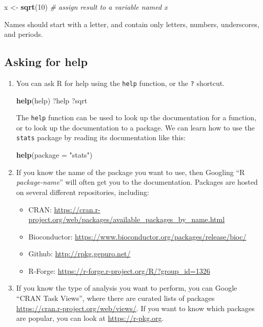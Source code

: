 \documentclass[
]{book}
\newenvironment{Shaded}{\begin{snugshade}}{\end{snugshade}}
\newcommand{\CommentTok}[1]{\textcolor[rgb]{0.56,0.35,0.01}{\textit{#1}}}
\newcommand{\DataTypeTok}[1]{\textcolor[rgb]{0.13,0.29,0.53}{#1}}
\newcommand{\DecValTok}[1]{\textcolor[rgb]{0.00,0.00,0.81}{#1}}
\newcommand{\KeywordTok}[1]{\textcolor[rgb]{0.13,0.29,0.53}{\textbf{#1}}}
\newcommand{\NormalTok}[1]{#1}
\newcommand{\StringTok}[1]{\textcolor[rgb]{0.31,0.60,0.02}{#1}}
\providecommand{\tightlist}{%
  \setlength{\itemsep}{0pt}\setlength{\parskip}{0pt}}
\begin{document}
\begin{Shaded}
\begin{Highlighting}[]
\NormalTok{x <-}\StringTok{ }\KeywordTok{sqrt}\NormalTok{(}\DecValTok{10}\NormalTok{) }\CommentTok{# assign result to a variable named x}
\end{Highlighting}
\end{Shaded}

Names should start with a letter, and contain only letters, numbers, underscores, and periods.

\hypertarget{asking-for-help}{%
\subsection{Asking for help}\label{asking-for-help}}

\begin{enumerate}
\def\labelenumi{\arabic{enumi}.}
\item
  You can ask R for help using the \texttt{help} function, or the \texttt{?} shortcut.

\begin{Shaded}
\begin{Highlighting}[]
\KeywordTok{help}\NormalTok{(help)}
\NormalTok{?help}
\NormalTok{?sqrt}
\end{Highlighting}
\end{Shaded}

  The \texttt{help} function can be used to look up the documentation for a function, or
  to look up the documentation to a package. We can learn how to use the \texttt{stats}
  package by reading its documentation like this:

\begin{Shaded}
\begin{Highlighting}[]
\KeywordTok{help}\NormalTok{(}\DataTypeTok{package =} \StringTok{"stats"}\NormalTok{)}
\end{Highlighting}
\end{Shaded}
\item
  If you know the name of the package you want to use, then Googling ``R \emph{package-name}'' will
  often get you to the documentation. Packages are hosted on several different repositories, including:

  \begin{itemize}
  \tightlist
  \item
    CRAN: \url{https://cran.r-project.org/web/packages/available_packages_by_name.html}
  \item
    Bioconductor: \url{https://www.bioconductor.org/packages/release/bioc/}
  \item
    Github: \url{http://rpkg.gepuro.net/}
  \item
    R-Forge: \url{https://r-forge.r-project.org/R/?group_id=1326}
  \end{itemize}
\item
  If you know the type of analysis you want to perform, you can Google ``CRAN Task Views'',
  where there are curated lists of packages \url{https://cran.r-project.org/web/views/}. If you want to
  know which packages are popular, you can look at \url{https://r-pkg.org}.
\end{enumerate}
\end{document}
